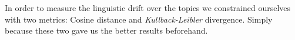 In order to measure the linguistic drift over the topics we constrained ourselves with two metrics: Cosine distance and \emph{Kullback-Leibler} divergence. Simply because these two gave us the better results beforehand. 